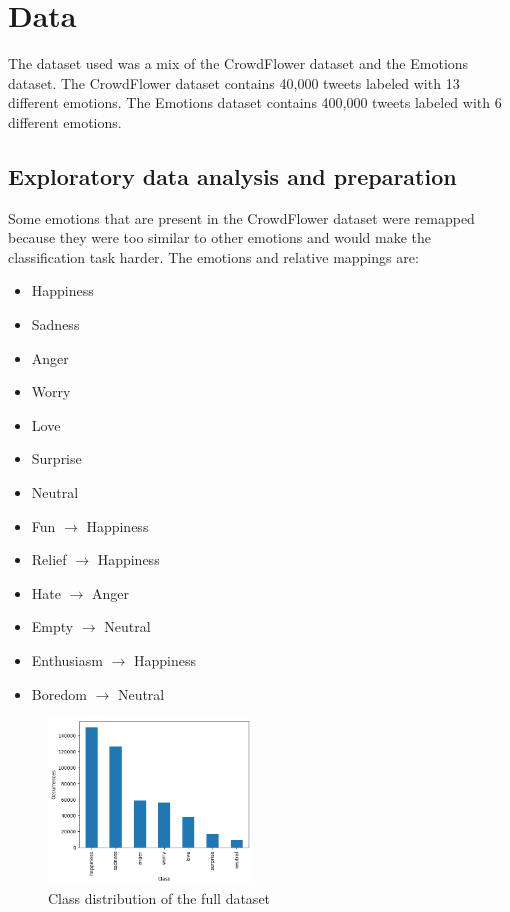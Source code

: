 \section{Data}
The dataset used was a mix of the CrowdFlower 
dataset\cite{crowdflower_dataset} and the
Emotions dataset\cite{emotions_dataset}.
The CrowdFlower dataset contains 40,000 tweets
labeled with 13 different emotions. The Emotions 
dataset contains 400,000 tweets labeled with 6 
different emotions.

\subsection{Exploratory data analysis and preparation}
Some emotions that are present in the
CrowdFlower dataset were remapped because they
were too similar to other emotions and 
would make the classification task harder.
The emotions and relative mappings are:
\begin{itemize}
    \item Happiness
    \item Sadness
    \item Anger
    \item Worry
    \item Love
    \item Surprise
    \item Neutral
    \item Fun $\rightarrow$ Happiness
    \item Relief $\rightarrow$ Happiness
    \item Hate $\rightarrow$ Anger
    \item Empty $\rightarrow$ Neutral
    \item Enthusiasm $\rightarrow$ Happiness
    \item Boredom $\rightarrow$ Neutral
\end{itemize}

\begin{figure}[H]
    \centering
    \includegraphics[width=0.48\textwidth]{images/class_distribution.png}
    \caption{Class distribution of the full dataset}
    \label{fig:class_distribution}
\end{figure}

